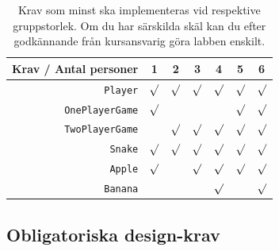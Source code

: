 \begin{table}[H]
  \centering
  \caption{Krav som minst ska implementeras vid respektive gruppstorlek. Om du har särskilda skäl kan du efter godkännande från kursansvarig göra labben enskilt.  \label{lab:snak:table-reqt}}

\begin{tabular}{r | c c c c c c}
  Krav / Antal personer & 1       & 2       & 3       & 4       & 5       & 6 \\ \hline
  \texttt{Player}       & $\surd$ & $\surd$ & $\surd$ & $\surd$ & $\surd$ & $\surd$ \\
  \texttt{OnePlayerGame}& $\surd$ &         &         &         & $\surd$ & $\surd$ \\
  \texttt{TwoPlayerGame}&         & $\surd$ & $\surd$ & $\surd$ & $\surd$ & $\surd$ \\
  \texttt{Snake}        & $\surd$ & $\surd$ & $\surd$ & $\surd$ & $\surd$ & $\surd$ \\
  \texttt{Apple}        & $\surd$ &         & $\surd$ & $\surd$ & $\surd$ & $\surd$ \\
  \texttt{Banana}       &         &         &         & $\surd$ &         & $\surd$ \\
\end{tabular}
\end{table}

\subsection{Obligatoriska design-krav}

